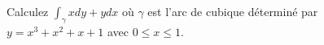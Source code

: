 
\begin{exercice}\label{exoVariete0007}

Calculez $\int_\gamma x dy+ y dx$ où $\gamma$ est l'arc de cubique déterminé par $y=x^3+x^2+x+1$ avec $0\leq x \leq 1$.

\end{exercice}
